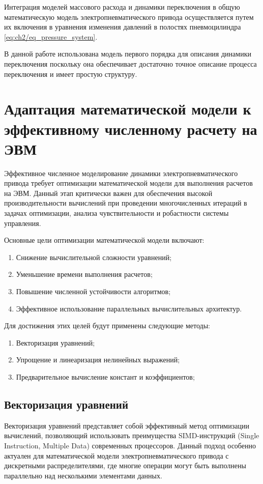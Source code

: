 Интеграция моделей массового расхода и динамики переключения
в общую математическую модель электропневматического привода
осуществляется путем их включения в уравнения
изменения давлений в полостях пневмоцилиндра \ref{eq:ch2/eq_pressure_system}.

В данной работе использована модель первого порядка для описания динамики переключения
поскольку она обеспечивает достаточно точное описание процесса переключения
и имеет простую структуру.


\section{Адаптация математической модели к эффективному численному расчету на ЭВМ}\label{sec:ch2/sec5}

Эффективное численное моделирование динамики электропневматического привода требует
оптимизации математической модели для выполнения расчетов на ЭВМ.
Данный этап критически важен для обеспечения высокой производительности
вычислений при проведении многочисленных итераций в задачах оптимизации,
анализа чувствительности и робастности системы управления.

Основные цели оптимизации математической модели включают:

\begin{enumerate}
    \item Снижение вычислительной сложности уравнений;
    \item Уменьшение времени выполнения расчетов;
    \item Повышение численной устойчивости алгоритмов;
    \item Эффективное использование параллельных вычислительных архитектур.
\end{enumerate}

Для достижения этих целей будут применены следующие методы:

\begin{enumerate}
    \item Векторизация уравнений;
    \item Упрощение и линеаризация нелинейных выражений;
    \item Предварительное вычисление констант и коэффициентов;
\end{enumerate}

\subsection{Векторизация уравнений}\label{sec:ch2/sec5/subsec1}
Векторизация уравнений представляет собой эффективный метод оптимизации вычислений,
позволяющий использовать преимущества SIMD-инструкций (Single Instruction, Multiple Data)
современных процессоров. Данный подход особенно актуален для математической
модели электропневматического привода с дискретными распределителями, где многие операции могут быть выполнены
параллельно \cite*{eichenberger2004simd} над несколькими элементами данных.

